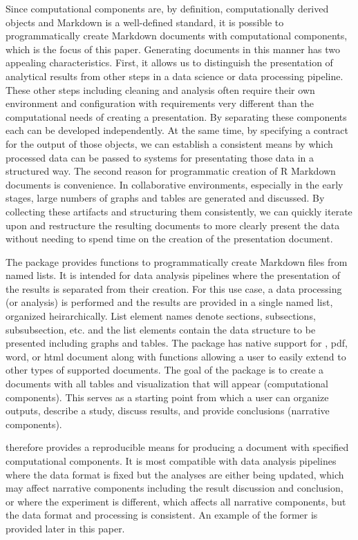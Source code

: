 \documentclass[
]{jss}
\begin{document}
Since computational components are, by definition, computationally
derived objects and  Markdown is a well-defined standard, it
is possible to programmatically create  Markdown documents
with computational components, which is the focus of this paper.
Generating documents in this manner has two appealing characteristics.
First, it allows us to distinguish the presentation of analytical
results from other steps in a data science or data processing pipeline.
These other steps including cleaning and analysis often require their
own environment and configuration with requirements very different than
the computational needs of creating a presentation. By separating these
components each can be developed independently. At the same time, by
specifying a contract for the output of those objects, we can establish
a consistent means by which processed data can be passed to systems for
presentating those data in a structured way. The second reason for
programmatic creation of R Markdown documents is convenience. In
collaborative environments, especially in the early stages, large
numbers of graphs and tables are generated and discussed. By collecting
these artifacts and structuring them consistently, we can quickly
iterate upon and restructure the resulting documents to more clearly
present the data without needing to spend time on the creation of the
presentation document.

The  package provides functions to programmatically create
 Markdown files from named lists. It is intended for data
analysis pipelines where the presentation of the results is separated
from their creation. For this use case, a data processing (or analysis)
is performed and the results are provided in a single named list,
organized heirarchically. List element names denote sections,
subsections, subsubsection, etc. and the list elements contain the data
structure to be presented including graphs and tables. The package has
native support for  \citep{blischak2019}, pdf, word, or
html document along with functions allowing a user to easily extend to
other types of supported documents. The goal of the package is to create
a documents with all tables and visualization that will appear
(computational components). This serves as a starting point from which a
user can organize outputs, describe a study, discuss results, and
provide conclusions (narrative components).

 therefore provides a reproducible means for producing a
document with specified computational components. It is most compatible
with data analysis pipelines where the data format is fixed but the
analyses are either being updated, which may affect narrative components
including the result discussion and conclusion, or where the experiment
is different, which affects all narrative components, but the data
format and processing is consistent. An example of the former is
provided later in this paper.
\end{document}
